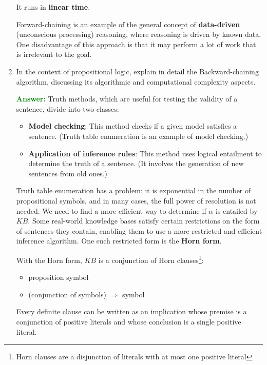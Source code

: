 \documentclass[12pt]{article}
\begin{document}
\begin{enumerate}[label=\textbf{PL.\arabic*}]
          It runs in \textbf{linear time}.

          Forward-chaining is an example of the general concept of \textbf{data-driven} (unconscious processing) reasoning, where reasoning is driven by known data. One disadvantage of this approach is that it may perform a lot of work that is irrelevant to the goal.

    \item In the context of propositional logic, explain in detail the Backward-chaining algorithm, discussing its algorithmic and computational complexity aspects.

          \textcolor{green}{\textbf{Answer:}}
          Truth methods, which are useful for testing the validity of a sentence, divide into two classes:
          \begin{itemize}
              \item \textbf{Model checking}: This method checks if a given model satisfies a sentence. (Truth table enumeration is an example of model checking.)
              \item \textbf{Application of inference rules}: This method uses logical entailment to determine the truth of a sentence. (It involves the generation of new sentences from old ones.)
          \end{itemize}

          Truth table enumeration has a problem: it is exponential in the number of propositional symbols, and in many cases, the full power of resolution is not needed.
          We need to find a more efficient way to determine if $\alpha$ is entailed by $KB$.
          Some real-world knowledge bases satisfy certain restrictions on the form of sentences they contain,
          enabling them to use a more restricted and efficient inference algorithm.
          One such restricted form is the \textbf{Horn form}.

          With the Horn form, $KB$ is a conjunction of Horn clauses\footnote{Horn clauses are a disjunction of literals with at most one positive literal}:
          \begin{itemize}
              \item proposition symbol
              \item (conjunction of symbols) $\Rightarrow$ symbol
          \end{itemize}
          Every definite clause can be written as an implication whose premise is a conjunction of positive literals and whose conclusion is a single positive literal.


\end{enumerate}
\end{document}
